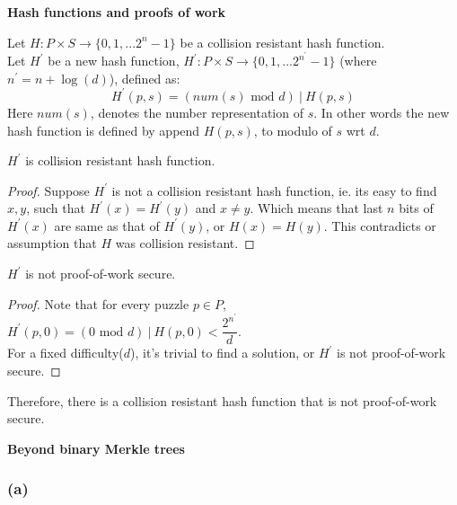 \documentclass[a4paper]{article}
\begin{document}
\begin{question}
    \textbf{Hash functions and proofs of work}
\end{question}
Let $H: P \times S \rightarrow \{ 0,1,...2^n-1 \}$ be a collision resistant hash function. \\

Let $H^\prime$ be a new hash function,
$H^\prime : P \times S \rightarrow \{ 0,1,...2^{n^{\prime}}-1 \}$ (where $n^\prime = n+\log(d)$), defined as:
$$H^\prime(p, s) = (num(s) \text{ mod } d) \: | \: H(p, s)$$
Here $num(s)$, denotes the number representation of $s$. In other words the new hash function is
defined by append $H(p, s)$, to modulo of $s$ wrt $d$.

\begin{warn}[Claim $1$:]
    $H^\prime$ is collision resistant hash function.
\end{warn}
\begin{proof}
    Suppose $H^\prime$ is not a collision resistant hash function, ie. its easy to find $x, y$, such that
    $H^\prime(x) = H^\prime(y)$ and $x \ne y$. Which means that last $n$ bits of $H^\prime(x)$
    are same as that of $H^\prime (y)$, or $H(x) = H(y)$. This contradicts or assumption that $H$
    was collision resistant. 
\end{proof}

\begin{warn}[claim $2$:]
    $H^\prime$ is not proof-of-work secure.
\end{warn}
\begin{proof}
    Note that for every puzzle $p \in P$, $H^\prime (p, 0) = (0 \text{ mod } d) \: | \: H(p, 0) < \dfrac{2^{n^\prime}}{d}$. \\

For a fixed difficulty($d$), it's trivial to find a solution, or $H^\prime$ is not proof-of-work secure.
\end{proof}
Therefore, there is a collision resistant hash function that is not proof-of-work secure.

\begin{question}
    \textbf{Beyond binary Merkle trees}
\end{question}
\subsubsection*{(a)}
\end{document}
